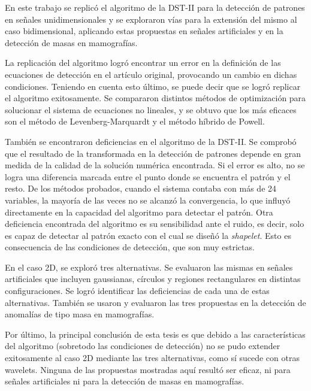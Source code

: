 \begin{conclusions}
	En este trabajo se replicó el algoritmo de la DST-II para la detección de patrones en 
	señales unidimensionales
	y se exploraron vías para la extensión del mismo al caso bidimensional, aplicando 
	estas propuestas en señales artificiales y en la detección de masas en mamografías.
	
	La replicación del algoritmo logró encontrar un error en la definición de las ecuaciones de detección 
	en el artículo original, provocando un cambio en dichas condiciones. Teniendo en cuenta esto último, se puede
	decir que se logró replicar el algoritmo exitosamente. 
	Se compararon distintos métodos de optimización para solucionar el sistema de ecuaciones no lineales, y
	se obtuvo que los más eficaces son el método de Levenberg-Marquardt y el método híbrido de Powell.

	También se encontraron deficiencias en el
	algoritmo de la DST-II. Se comprobó que el resultado de la transformada en la detección 
	de patrones depende en gran medida
	de la calidad de la solución numérica encontrada. Si el error es alto, no se logra una diferencia marcada
	entre el punto donde se encuentra el patrón y el resto. De los métodos probados, cuando el sistema contaba
	con más de 24 variables, la mayoría de las veces no se alcanzó la convergencia, lo que influyó 
	directamente en la capacidad del algoritmo para detectar el patrón. Otra deficiencia encontrada del 
	algoritmo es su sensibilidad ante el ruido, es decir, solo es capaz de detectar al patrón exacto con el cual 
	se diseñó la \textit{shapelet}. Esto es consecuencia de las condiciones de detección, que son muy estrictas.

	En el caso 2D, se exploró tres alternativas. Se evaluaron las mismas en señales artificiales que incluyen
	gaussianas, círculos y regiones rectangulares en distintas configuraciones. Se logró identificar
	las deficiencias de cada una de estas alternativas. También se usaron y evaluaron las tres
	propuestas en la detección de anomalías de tipo masa en mamografías.
	 
	Por último, la principal conclusión de esta tesis es que debido a las características del algoritmo (sobretodo las 
	condiciones de detección) 
	no se pudo extender exitosamente al caso 2D mediante las tres alternativas, como sí sucede con otras wavelets. 
	Ninguna de las propuestas mostradas aquí
	resultó ser eficaz, ni para señales artificiales ni para la detección de masas en mamografías.

\end{conclusions}

